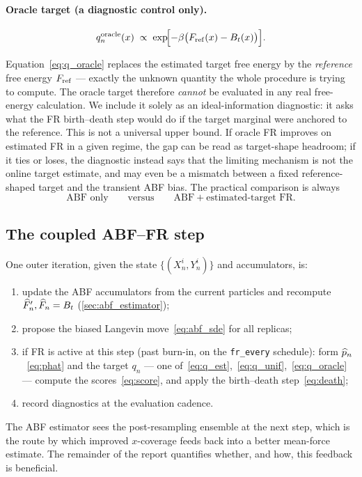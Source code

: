 \paragraph{Oracle target (a diagnostic control only).}
\begin{equation}
  q_n^{\mathrm{oracle}}(x) \;\propto\;
  \exp\!\Bigl[-\beta\bigl(F_{\mathrm{ref}}(x)-B_t(x)\bigr)\Bigr].
  \label{eq:q_oracle}
\end{equation}
\begin{remark}
\label{rem:oracle}
Equation~\eqref{eq:q_oracle} replaces the estimated target free energy by the
\emph{reference} free energy $F_{\mathrm{ref}}$ --- exactly the unknown quantity the whole
procedure is trying to compute. The oracle target therefore \emph{cannot} be
evaluated in any real free-energy calculation. We include it solely as an
ideal-information diagnostic: it asks what the FR birth--death step would do if
the target marginal were anchored to the reference. This is not a universal upper
bound. If oracle FR improves on estimated FR in a given regime, the gap can be
read as target-shape headroom; if it ties or loses, the diagnostic instead says
that the limiting mechanism is not the online target estimate, and may even be a
mismatch between a fixed reference-shaped target and the transient ABF bias. The
practical comparison is always
\[
  \text{ABF only}\qquad\text{versus}\qquad\text{ABF}+\text{estimated-target FR}.
\]
\end{remark}

\subsection{The coupled ABF--FR step}
One outer iteration, given the state $\{(X^i_n,Y^i_n)\}$ and accumulators, is:
\begin{enumerate}
  \item update the ABF accumulators from the current particles and recompute
        $\widehat{F}'_n,\widehat{F}_n=B_t$ (\cref{sec:abf_estimator});
  \item propose the biased Langevin move~\eqref{eq:abf_sde} for all replicas;
  \item if FR is active at this step (past burn-in, on the \texttt{fr\_every}
        schedule): form $\widehat{p}_n$~\eqref{eq:phat} and the target $q_n$ ---
        one of~\eqref{eq:q_est},~\eqref{eq:q_unif},~\eqref{eq:q_oracle} ---
        compute the scores~\eqref{eq:score}, and apply the birth--death
        step~\eqref{eq:death};
  \item record diagnostics at the evaluation cadence.
\end{enumerate}
The ABF estimator sees the post-resampling ensemble at the next step, which is
the route by which improved $x$-coverage feeds back into a better mean-force
estimate. The remainder of the report quantifies whether, and how, this feedback
is beneficial.
